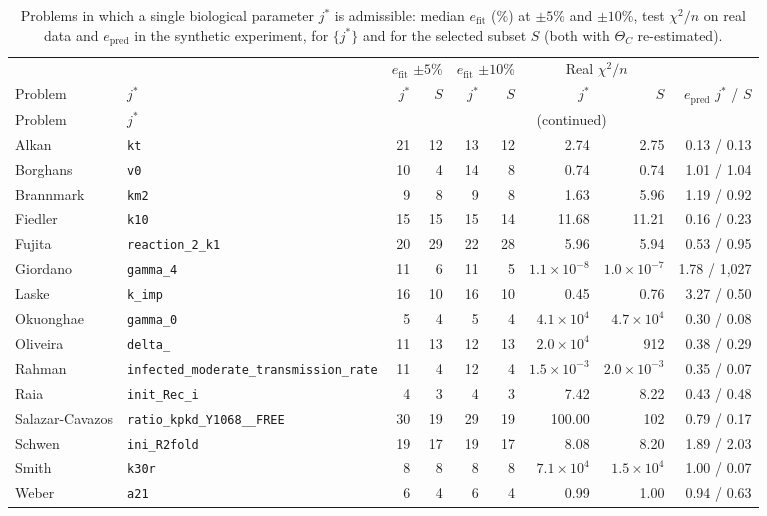 {\small
\begin{longtable}{@{}>{\raggedright\arraybackslash}p{2.2cm}>{\raggedright\arraybackslash}p{3.0cm}rrrrrrr@{}}
\caption{Problems in which a single biological parameter $j^\ast$ is admissible: median $e_{\mathrm{fit}}$ (\%) at $\pm5\%$ and $\pm10\%$, test $\chi^2/n$ on real data and $e_{\mathrm{pred}}$ in the synthetic experiment, for $\{j^\ast\}$ and for the selected subset $S$ (both with $\Theta_C$ re-estimated).}\label{tab:single}\\
\toprule & & \multicolumn{2}{c}{$e_{\mathrm{fit}}$ $\pm5\%$} & \multicolumn{2}{c}{$e_{\mathrm{fit}}$ $\pm10\%$} & \multicolumn{2}{c}{Real $\chi^2/n$} & \\ \cmidrule(lr){3-4}\cmidrule(lr){5-6}\cmidrule(lr){7-8}
Problem & $j^\ast$ & $j^\ast$ & $S$ & $j^\ast$ & $S$ & $j^\ast$ & $S$ & $e_{\mathrm{pred}}$ $j^\ast$ / $S$ \\ \midrule \endfirsthead
\toprule Problem & $j^\ast$ & \multicolumn{7}{c}{(continued)} \\ \midrule \endhead
Alkan & \texttt{kt} & 21 & 12 & 13 & 12 & 2.74 & 2.75 & 0.13 / 0.13 \\
Borghans & \texttt{v0} & 10 & 4 & 14 & 8 & 0.74 & 0.74 & 1.01 / 1.04 \\
Brannmark & \texttt{km2} & 9 & 8 & 9 & 8 & 1.63 & 5.96 & 1.19 / 0.92 \\
Fiedler & \texttt{k10} & 15 & 15 & 15 & 14 & 11.68 & 11.21 & 0.16 / 0.23 \\
Fujita & \texttt{reaction\_\allowbreak{}2\_\allowbreak{}k1} & 20 & 29 & 22 & 28 & 5.96 & 5.94 & 0.53 / 0.95 \\
Giordano & \texttt{gamma\_4} & 11 & 6 & 11 & 5 & $1.1\times10^{-8}$ & $1.0\times10^{-7}$ & 1.78 / 1,027 \\
Laske & \texttt{k\_imp} & 16 & 10 & 16 & 10 & 0.45 & 0.76 & 3.27 / 0.50 \\
Okuonghae & \texttt{gamma\_0} & 5 & 4 & 5 & 4 & $4.1\times10^{4}$ & $4.7\times10^{4}$ & 0.30 / 0.08 \\
Oliveira & \texttt{delta\_} & 11 & 13 & 12 & 13 & $2.0\times10^{4}$ & 912 & 0.38 / 0.29 \\
Rahman & \texttt{infected\_\allowbreak{}moderate\_\allowbreak{}transmission\_\allowbreak{}rate} & 11 & 4 & 12 & 4 & $1.5\times10^{-3}$ & $2.0\times10^{-3}$ & 0.35 / 0.07 \\
Raia & \texttt{init\_Rec\_i} & 4 & 3 & 4 & 3 & 7.42 & 8.22 & 0.43 / 0.48 \\
Salazar-Cavazos & \texttt{ratio\_\allowbreak{}kpkd\_\allowbreak{}Y1068\_\allowbreak{}\_\allowbreak{}FREE} & 30 & 19 & 29 & 19 & 100.00 & 102 & 0.79 / 0.17 \\
Schwen & \texttt{ini\_R2fold} & 19 & 17 & 19 & 17 & 8.08 & 8.20 & 1.89 / 2.03 \\
Smith & \texttt{k30r} & 8 & 8 & 8 & 8 & $7.1\times10^{4}$ & $1.5\times10^{4}$ & 1.00 / 0.07 \\
Weber & \texttt{a21} & 6 & 4 & 6 & 4 & 0.99 & 1.00 & 0.94 / 0.63 \\
\bottomrule \end{longtable}}

